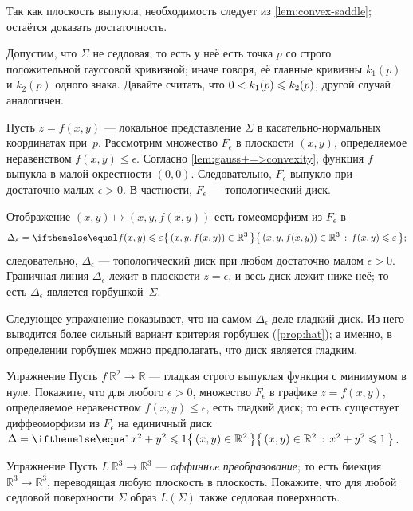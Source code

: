 Так как плоскость выпукла, необходимость следует из \ref{lem:convex-saddle};
остаётся доказать достаточность.

Допустим, что $\Sigma$ не седловая; то есть у неё есть точка $p$ со строго положительной гауссовой кривизной;
иначе говоря, её главные кривизны $k_1(p)$ и $k_2(p)$ одного знака.
Давайте считать, что $0 < k_1(p) \z\le k_2(p)$, другой случай аналогичен.

Пусть $z=f(x,y)$ --- локальное представление $\Sigma$ в касательно-нормальных координатах при~$p$.
Рассмотрим множество $F_\epsilon$ в плоскости $(x,y)$, определяемое неравенством $f(x,y)\le \epsilon$.
Согласно \ref{lem:gauss+=>convexity}, функция $f$ выпукла в малой окрестности $(0,0)$.
Следовательно, $F_\epsilon$ выпукло при достаточно малых $\epsilon>0$.
В частности, $F_\epsilon$ --- топологический диск.

Отображение $(x,y)\mapsto (x,y,f(x,y))$ есть гомеоморфизм из $F_\epsilon$
в
\[\Delta_\epsilon=\set{(x,y,f(x,y))\in \mathbb{R}^3}{f(x,y)\le \epsilon};\]
следовательно,
$\Delta_\epsilon$ --- топологический диск при любом достаточно малом $\epsilon>0$.
Граничная линия $\Delta_\epsilon$ лежит в плоскости $z=\epsilon$, и весь диск лежит ниже неё;
то есть $\Delta_\epsilon$ является горбушкой~$\Sigma$.
\qeds

Следующее упражнение показывает, что на самом $\Delta_\epsilon$ деле гладкий диск.
Из него выводится более сильный вариант критерия горбушек (\ref{prop:hat});
а именно, в определении горбушек можно предполагать, что диск является гладким.

\begin{thm}{Упражнение}\label{ex:disc-hat}
Пусть $f\:\mathbb{R}^2\to\mathbb{R}$ --- гладкая строго выпуклая функция с минимумом в нуле.
Покажите, что для любого $\epsilon>0$, множество $F_\epsilon$ в графике $z=f(x,y)$, определяемое неравенством $f(x,y)\le \epsilon$, есть гладкий диск;
то есть существует диффеоморфизм из
$F_\epsilon$ на единичный диск $\Delta\z=\set{(x,y)\in\mathbb{R}^2}{x^2+y^2\le 1}$.
\end{thm}

\begin{thm}{Упражнение}\label{ex:saddle-linear}
Пусть $L\:\mathbb{R}^3\to\mathbb{R}^3$ --- \emph{аффиннoe преобразование}; то есть биекция $\mathbb{R}^3\to\mathbb{R}^3$, переводящая любую плоскость в плоскость. 
Покажите, что для любой седловой поверхности $\Sigma$ образ $L(\Sigma)$ также седловая поверхность.
\end{thm}



